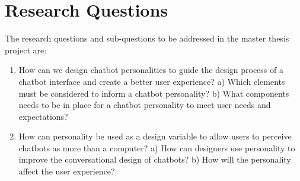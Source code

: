 \section{Research Questions}
The research questions and sub-questions to be addressed in the master thesis project are:

\begin{enumerate}
    \item How can we design chatbot personalities to guide the design process of a chatbot interface and create a better user experience?
    \subitem a) Which elements must be considered to inform a chatbot personality?
    \subitem b) What components needs to be in place for a chatbot personality to meet user needs and expectations?
    \item How can personality be used as a design variable to allow users to perceive chatbots as more than a computer?
        \subitem a) How can designers use personality to improve the conversational design of chatbots?
        \subitem b) How will the personality affect the user experience?
        \end{enumerate}
